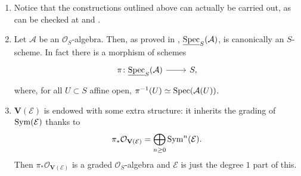 \begin{rem}[]\leavevmode\vspace{-.2\baselineskip}
\begin{enumerate}
	\item Notice that the constructions outlined above can actually be carried out,
		as can be checked at 
		\cite[\href{https://stacks.math.columbia.edu/tag/01LL}{Section 01LL}]{SP}
		and
		\cite[\href{https://stacks.math.columbia.edu/tag/01M1}{Section 01M1}]{SP}.

	\item Let $\mathcal{A}$ be an $\mathcal{O}_{ S }$-algebra. 
		Then, as proved in 
		\cite[\href{https://stacks.math.columbia.edu/tag/01LP}{Lemma 01LP}]{SP},
		$\underline{\operatorname{Spec}}_S(\mathcal{A})$, is canonically an $S$-scheme.
		In fact there is a morphism of schemes
		\begin{equation*}
		\begin{tikzcd}[row sep = 0ex
			,/tikz/column 1/.append style={anchor=base east}
			,/tikz/column 2/.append style={anchor=base west}]
			\pi\colon \underline{\spec}_S(\mathcal{A})
			\arrow[r, "", rightarrow] &
			S
		,\end{tikzcd}
		\end{equation*} 
		where, for all $U \subset S$ affine open,
		$\pi^{-1}(U) \simeq \operatorname{Spec}(\mathcal{A}(U))$.

	\item $\mathbf{V}(\mathcal{E})$ is endowed with
		some extra structure: it inherits the grading of $\operatorname{Sym}(\mathcal{E})$
		thanks to
		\begin{equation*}
			\pi_* \mathcal{O}_{ \mathbf{V}(\mathcal{E}) } =
			\bigoplus_{n \geq 0} \operatorname{Sym}^n (\mathcal{E})
		.\end{equation*}
		Then $\pi_* \mathcal{O}_{ \mathbf{V}(\mathcal{E}) }$ is a graded
		$\mathcal{O}_{ S }$-algebra and $\mathcal{E}$ is just the degree $1$ part
		of this.
\end{enumerate}
\end{rem}


